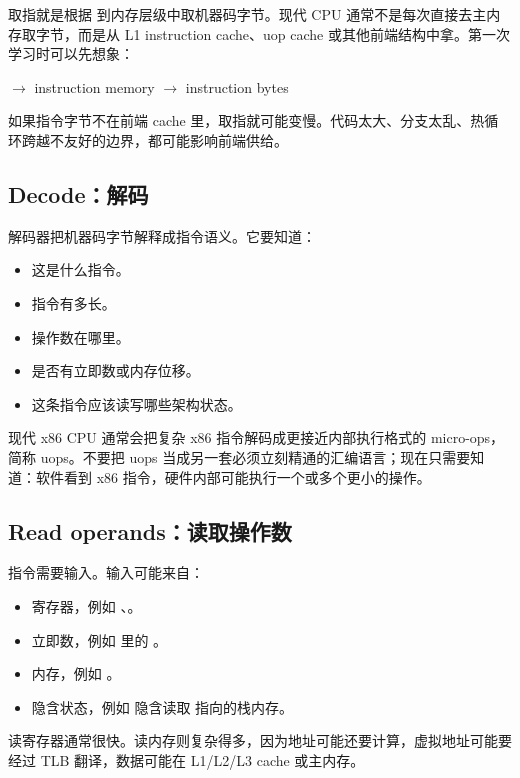 取指就是根据  到内存层级中取机器码字节。现代 CPU 通常不是每次直接去主内存取字节，而是从 L1 instruction cache、uop cache 或其他前端结构中拿。第一次学习时可以先想象：

\begin{center}
 $\rightarrow$ instruction memory $\rightarrow$ instruction bytes
\end{center}

如果指令字节不在前端 cache 里，取指就可能变慢。代码太大、分支太乱、热循环跨越不友好的边界，都可能影响前端供给。

\subsection{Decode：解码}

解码器把机器码字节解释成指令语义。它要知道：

\begin{itemize}
  \item 这是什么指令。
  \item 指令有多长。
  \item 操作数在哪里。
  \item 是否有立即数或内存位移。
  \item 这条指令应该读写哪些架构状态。
\end{itemize}

现代 x86 CPU 通常会把复杂 x86 指令解码成更接近内部执行格式的 micro-ops，简称 uops。不要把 uops 当成另一套必须立刻精通的汇编语言；现在只需要知道：软件看到 x86 指令，硬件内部可能执行一个或多个更小的操作。

\subsection{Read operands：读取操作数}

指令需要输入。输入可能来自：

\begin{itemize}
  \item 寄存器，例如 、。
  \item 立即数，例如  里的 。
  \item 内存，例如 。
  \item 隐含状态，例如  隐含读取  指向的栈内存。
\end{itemize}

读寄存器通常很快。读内存则复杂得多，因为地址可能还要计算，虚拟地址可能要经过 TLB 翻译，数据可能在 L1/L2/L3 cache 或主内存。

